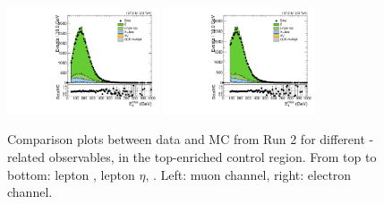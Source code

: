 \begin{figure}[htbp]
  \includegraphics[width=0.4\textwidth]{fig/controlPlots/CR_b1_mu_allP_allC_allE_Run2_met_pt.pdf}
  \includegraphics[width=0.4\textwidth]{fig/controlPlots/CR_b1_e_allP_allC_allE_Run2_met_pt.pdf}\\
  \caption{
    Comparison plots between data and MC from Run 2 for different \Wlep-related observables, in the top-enriched control region.
    From top to bottom: lepton \pt, lepton $\eta$, \Etmiss.
    Left: muon channel, right: electron channel.
  }
  \label{fig:CR_controlPlotsRun2_1}
\end{figure}


